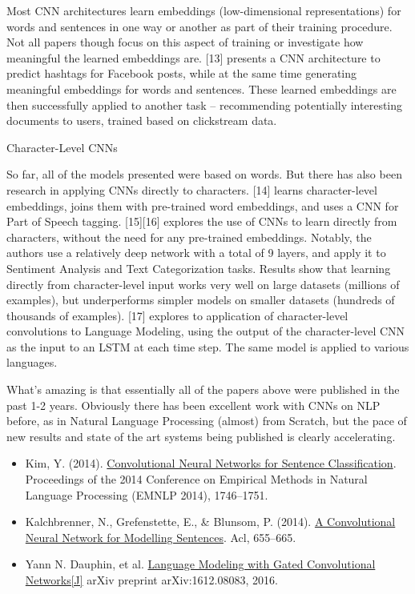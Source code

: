 \documentclass[UTF8,11pt,a4paper]{ctexart}
\begin{document}
Most CNN architectures learn embeddings (low-dimensional representations) for words and sentences in one way or another as part of their training procedure. Not all papers though focus on this aspect of training or investigate how meaningful the learned embeddings are. [13] presents a CNN architecture to predict hashtags for Facebook posts, while at the same time generating meaningful embeddings for words and sentences. These learned embeddings are then successfully applied to another task – recommending potentially interesting documents to users, trained based on clickstream data.

Character-Level CNNs

So far, all of the models presented were based on words. But there has also been research in applying CNNs directly to characters. [14] learns character-level embeddings, joins them with pre-trained word embeddings, and uses a CNN for Part of Speech tagging. [15][16] explores the use of CNNs to learn directly from characters, without the need for any pre-trained embeddings. Notably, the authors use a relatively deep network with a total of 9 layers, and apply it to Sentiment Analysis and Text Categorization tasks. Results show that learning directly from character-level input works very well on large datasets (millions of examples), but underperforms simpler models on smaller datasets (hundreds of thousands of examples). [17] explores to application of character-level convolutions to Language Modeling, using the output of the character-level CNN as the input to an LSTM at each time step. The same model is applied to various languages.

What's amazing is that essentially all of the papers above were published in the past 1-2 years. Obviously there has been excellent work with CNNs on NLP before, as in Natural Language Processing (almost) from Scratch, but the pace of new results and state of the art systems being published is clearly accelerating.

\begin{itemize}
\item Kim, Y. (2014). \href{http://arxiv.org/pdf/1408.5882}{Convolutional Neural Networks for Sentence Classification}. Proceedings of the 2014 Conference on Empirical Methods in Natural Language Processing (EMNLP 2014), 1746–1751.
\item Kalchbrenner, N., Grefenstette, E., \& Blunsom, P. (2014). \href{http://arxiv.org/pdf/1404.2188.pdf}{A Convolutional Neural Network for Modelling Sentences}. Acl, 655–665.
\item Yann N. Dauphin, et al. \href{https://arxiv.org/pdf/1612.08083v1.pdf}{Language Modeling with Gated Convolutional Networks[J]} arXiv preprint arXiv:1612.08083, 2016.
\end{itemize}
\end{document}
